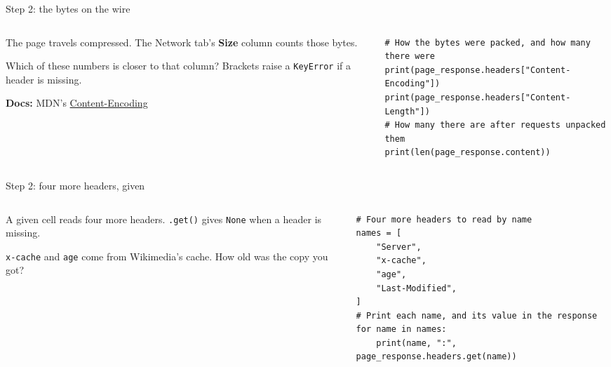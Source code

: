 \documentclass[9pt,aspectratio=169]{beamer}
\begin{document}
\begin{frame}[fragile]{Step 2: the bytes on the wire}
    \begin{columns}[T]
        \begin{column}{0.37\textwidth}
            The page travels compressed. The Network tab's \textbf{Size} column counts those bytes.

            \medskip
            Which of these numbers is closer to that column? Brackets raise a \texttt{KeyError} if a header is missing.

            \medskip
            {\scriptsize\textbf{Docs:} MDN's \href{https://developer.mozilla.org/en-US/docs/Web/HTTP/Reference/Headers/Content-Encoding}{Content-Encoding}\par}
        \end{column}
        \begin{column}{0.6\textwidth}
\begin{lstlisting}[style=lab]
# How the bytes were packed, and how many there were
print(page_response.headers["Content-Encoding"])
print(page_response.headers["Content-Length"])
# How many there are after requests unpacked them
print(len(page_response.content))
\end{lstlisting}
        \end{column}
    \end{columns}
\end{frame}

\begin{frame}[fragile]{Step 2: four more headers, given}
    \begin{columns}[T]
        \begin{column}{0.37\textwidth}
            A given cell reads four more headers. \texttt{.get()} gives \texttt{None} when a header is missing.

            \medskip
            \texttt{x-cache} and \texttt{age} come from Wikimedia's cache. How old was the copy you got?
        \end{column}
        \begin{column}{0.6\textwidth}
\begin{lstlisting}[style=lab]
# Four more headers to read by name
names = [
    "Server",
    "x-cache",
    "age",
    "Last-Modified",
]
# Print each name, and its value in the response
for name in names:
    print(name, ":", page_response.headers.get(name))
\end{lstlisting}
        \end{column}
    \end{columns}
\end{frame}
\end{document}
